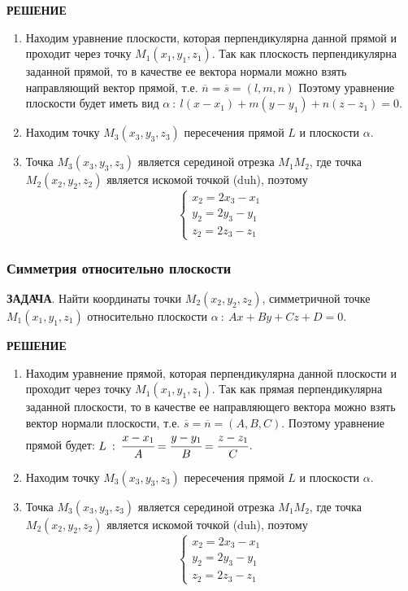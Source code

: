 \documentclass{article}
\begin{document}
\textbf{РЕШЕНИЕ}
\begin{enumerate}
    \item Находим уравнение плоскости, которая перпендикулярна данной прямой и проходит через точку $M_1(x_1,y_1,z_1)$. Так как плоскость перпендикулярна заданной прямой, то в качестве ее вектора нормали можно взять направляющий вектор прямой, т.е. $\overline{n}=\overline{s}=(l,m,n)$ Поэтому уравнение плоскости будет иметь вид $\alpha\::\:l(x-x_1)+m(y-y_1)+n(z-z_1)=0$.
    \item Находим точку $M_3(x_3,y_3,z_3)$ пересечения прямой $L$ и плоскости $\alpha$.
    \item Точка $M_3(x_3,y_3,z_3)$ является серединой отрезка $M_1M_2$, где точка $M_2(x_2,y_2,z_2)$ является искомой точкой (duh), поэтому
    $$ \begin{cases}x_2=2x_3-x_1\\y_2=2y_3-y_1\\z_2=2z_3-z_1 \end{cases} $$
\end{enumerate}
\subsubsection{Симметрия относительно плоскости}
\textbf{ЗАДАЧА}. Найти координаты точки $M_2(x_2,y_2,z_2)$, симметричной точке $M_1(x_1,y_1,z_1)$ относительно плоскости $\alpha\::\:Ax+By+Cz+D=0$.

\textbf{РЕШЕНИЕ}
\begin{enumerate}
    \item Находим уравнение прямой, которая перпендикулярна данной плоскости и проходит через точку $M_1(x_1,y_1,z_1)$. Так как прямая перпендикулярна заданной плоскости, то в качестве ее направляющего вектора можно взять вектор нормали плоскости, т.е. $\overline{s}=\overline{n}=(A,B,C)$. Поэтому уравнение прямой будет: $L\::\:\cfrac{x-x_1}{A}=\cfrac{y-y_1}{B}=\cfrac{z-z_1}{C}$.
    \item Находим точку $M_3(x_3,y_3,z_3)$ пересечения прямой $L$ и плоскости $\alpha$.
    \item Точка $M_3(x_3,y_3,z_3)$ является серединой отрезка $M_1M_2$, где точка $M_2(x_2,y_2,z_2)$ является искомой точкой (duh), поэтому
    $$ \begin{cases}x_2=2x_3-x_1\\y_2=2y_3-y_1\\z_2=2z_3-z_1 \end{cases} $$
\end{enumerate}
\end{document}
